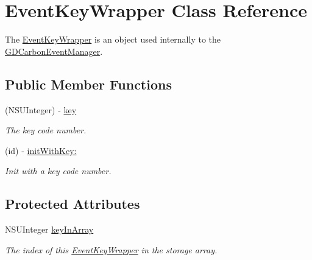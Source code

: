 \hypertarget{interface_event_key_wrapper}{
\section{EventKeyWrapper Class Reference}
\label{interface_event_key_wrapper}
}


The \hyperlink{interface_event_key_wrapper}{EventKeyWrapper} is an object used internally to the \hyperlink{interface_g_d_carbon_event_manager}{GDCarbonEventManager}.  
\subsection*{Public Member Functions}
\begin{DoxyCompactItemize}
\item 
\hypertarget{interface_event_key_wrapper_aadb96c3d2f22a762e63bf6c3f6362e17}{
(NSUInteger) -\/ \hyperlink{interface_event_key_wrapper_aadb96c3d2f22a762e63bf6c3f6362e17}{key}}
\label{interface_event_key_wrapper_aadb96c3d2f22a762e63bf6c3f6362e17}

\begin{DoxyCompactList}\small\item\em The key code number. \item\end{DoxyCompactList}\item 
\hypertarget{interface_event_key_wrapper_ab2ed0afe2d80835ca02187c59315159d}{
(id) -\/ \hyperlink{interface_event_key_wrapper_ab2ed0afe2d80835ca02187c59315159d}{initWithKey:}}
\label{interface_event_key_wrapper_ab2ed0afe2d80835ca02187c59315159d}

\begin{DoxyCompactList}\small\item\em Init with a key code number. \item\end{DoxyCompactList}\end{DoxyCompactItemize}
\subsection*{Protected Attributes}
\begin{DoxyCompactItemize}
\item 
\hypertarget{interface_event_key_wrapper_afe7c15f44098176f90f28812bfdb810f}{
NSUInteger \hyperlink{interface_event_key_wrapper_afe7c15f44098176f90f28812bfdb810f}{keyInArray}}
\label{interface_event_key_wrapper_afe7c15f44098176f90f28812bfdb810f}

\begin{DoxyCompactList}\small\item\em The index of this \hyperlink{interface_event_key_wrapper}{EventKeyWrapper} in the storage array. \item\end{DoxyCompactList}\end{DoxyCompactItemize}


